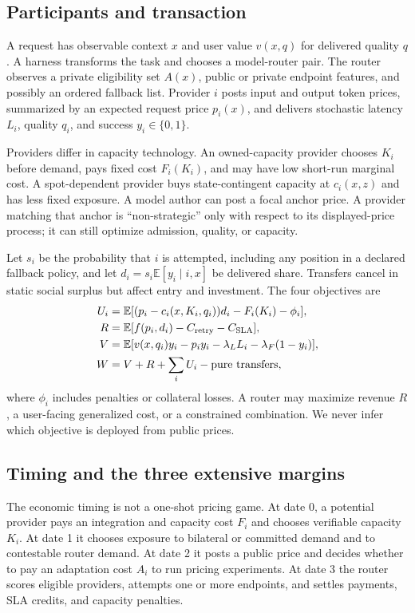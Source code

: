 \documentclass[sigconf,nonacm]{acmart}
\newcommand{\E}{\mathbb E}
\newcommand{\1}{\mathbf 1}
\begin{document}
\subsection{Participants and transaction}

A request has observable context $x$ and user value $v(x,q)$ for delivered
quality $q$.  A harness transforms the task and chooses a model-router pair.  The
router observes a private eligibility set $A(x)$, public or private endpoint
features, and possibly an ordered fallback list.  Provider $i$ posts input and
output token prices, summarized by an expected request price $p_i(x)$, and
delivers stochastic latency $L_i$, quality $q_i$, and success $y_i\in\{0,1\}$.

Providers differ in capacity technology.  An owned-capacity provider chooses
$K_i$ before demand, pays fixed cost $F_i(K_i)$, and may have low short-run
marginal cost.  A spot-dependent provider buys state-contingent capacity at
$c_i(x,z)$ and has less fixed exposure.  A model author can post a focal anchor
price.  A provider matching that anchor is ``non-strategic'' only with respect
to its displayed-price process; it can still optimize admission, quality, or
capacity.

Let $s_i$ be the probability that $i$ is attempted, including any position in a
declared fallback policy, and let $d_i=s_i\E[y_i\mid i,x]$ be delivered share.
Transfers cancel in static social surplus but affect entry and investment.  The
four objectives are
\begin{align}
U_i &= \E[(p_i-c_i(x,K_i,q_i))d_i-F_i(K_i)-\phi_i], \\
R &= \E[f(p_i,d_i)-C_{\rm retry}-C_{\rm SLA}], \\
V &= \E[v(x,q_i)y_i-p_i y_i-\lambda_L L_i-\lambda_F(1-y_i)], \\
W &= V+R+\sum_i U_i-\text{pure transfers},
\label{eq:objectives}
\end{align}
where $\phi_i$ includes penalties or collateral losses.  A router may maximize
revenue $R$, a user-facing generalized cost, or a constrained combination.  We
never infer which objective is deployed from public prices.

\subsection{Timing and the three extensive margins}

The economic timing is not a one-shot pricing game.  At date 0, a potential
provider pays an integration and capacity cost $F_i$ and chooses verifiable
capacity $K_i$.  At date 1 it chooses exposure to bilateral or committed demand
and to contestable router demand.  At date 2 it posts a public price and decides
whether to pay an adaptation cost $A_i$ to run pricing experiments.  At date 3
the router scores eligible providers, attempts one or more endpoints, and
settles payments, SLA credits, and capacity penalties.
\end{document}
